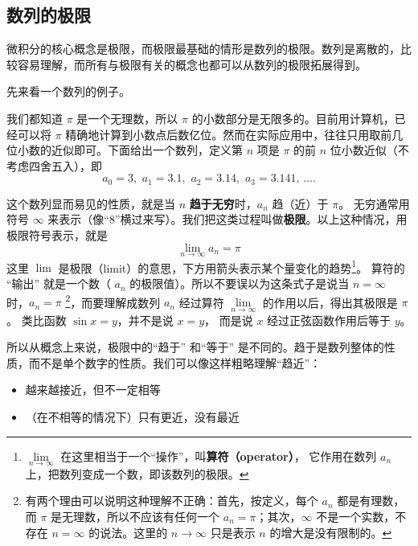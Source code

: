 

\subsection{数列的极限}

微积分的核心概念是极限，而极限最基础的情形是数列的极限。数列是离散的，比较容易理解，而所有与极限有关的概念也都可以从数列的极限拓展得到。

先来看一个数列的例子。

\begin{example}{}\label{ex_Lim_1}
我们都知道 $\pi$ 是一个无理数，所以 $\pi$ 的小数部分是无限多的。目前用计算机，已经可以将 $\pi$ 精确地计算到小数点后数亿位。然而在实际应用中，往往只用取前几位小数的近似即可。下面给出一个数列，定义第 $n$ 项是 $\pi$ 的前 $n$ 位小数近似（不考虑四舍五入），即
\begin{equation}
a_0 = 3,\,\, a_1 = 3.1,\,\, a_2 = 3.14,\,\, a_3 = 3.141,\,\dots.
\end{equation}
\end{example}

这个数列显而易见的性质，就是当 $n$ \textbf{趋于无穷}时，$a_n$ 趋（近）于 $\pi$。 无穷通常用符号 $\infty$ 来表示（像“8”横过来写）。我们把这类过程叫做\textbf{极限}。以上这种情况，用极限符号表示，就是
\begin{equation}
\lim_{n \to \infty } {a_n} = \pi 
\end{equation}
这里 $\lim$ 是极限（limit）的意思，下方用箭头表示某个量变化的趋势\footnote{$\lim\limits_{n \to \infty }$ 在这里相当于一个“操作”，叫\textbf{算符（operator）}， 它作用在数列 $a_n$ 上，把数列变成一个数，即该数列的极限。}。 算符的 “输出” 就是一个数（ $a_n$ 的极限值）。所以不要误以为这条式子是说当 $n = \infty$ 时，$a_n=\pi$ \footnote{有两个理由可以说明这种理解不正确：首先，按定义，每个 $a_n$ 都是有理数，而 $\pi$ 是无理数，所以不应该有任何一个 $a_n=\pi$；其次，$\infty$ 不是一个实数，不存在 $n=\infty$ 的说法。这里的 $n\to\infty$ 只是表示 $n$ 的增大是没有限制的。}，而要理解成数列 $a_n$ 经过算符 $\lim\limits_{n \to \infty }$ 的作用以后，得出其极限是 $\pi$。 类比函数 $\sin x = y$，并不是说 $x=y$， 而是说 $x$ 经过正弦函数作用后等于 $y$。 

所以从概念上来说，极限中的“趋于” 和“等于” 是不同的。趋于是数列整体的性质，而不是单个数字的性质。我们可以像这样粗略理解“趋近”：
\begin{itemize}
\item 越来越接近，但不一定相等
\item （在不相等的情况下）只有更近，没有最近
\end{itemize}

